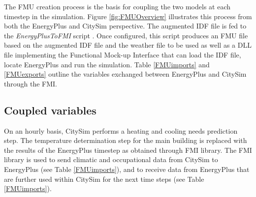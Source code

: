 \documentclass{tBPS2e}
\theoremstyle{plain}
\theoremstyle{definition}
\theoremstyle{remark}
\begin{document}
The FMU creation process is the basis for coupling the two models at each timestep in the simulation. Figure \ref{fig:FMUOverview} illustrates this process from both the EnergyPlus and CitySim perspective. The augmented IDF file is fed to the \emph{EnergyPlusToFMI} script \citep{Nouidui:2014bo}. Once configured, this script produces an FMU file based on the augmented IDF file and the weather file to be used as well as a DLL file implementing the Functional Mock-up Interface that can load the IDF file, locate EnergyPlus and run the simulation. Table \ref{FMUimports} and \ref{FMUexports} outline the variables exchanged between EnergyPlus and CitySim through the FMI. 


\subsection{Coupled variables}

On an hourly basis, CitySim performs a heating and cooling needs prediction step. The temperature determination step for the main building is replaced with the results of the EnergyPlus timestep as obtained through FMI library. The FMI library is used to send climatic and occupational data from CitySim to EnergyPlus (see Table \ref{FMUimports}), and to receive data from EnergyPlus that are further used within CitySim for the next time steps (see Table \ref{FMUimports}).
\end{document}
